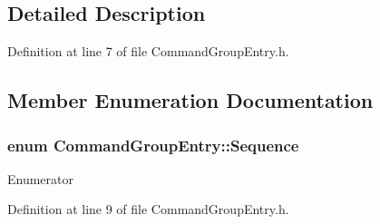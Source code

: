 \subsection{Detailed Description}


Definition at line 7 of file Command\-Group\-Entry.\-h.



\subsection{Member Enumeration Documentation}
\hypertarget{classCommandGroupEntry_a0c435eb6049bef341e92b3550e8f20b1}{
\subsubsection[{Sequence}]{\setlength{\rightskip}{0pt plus 5cm}enum {\bf Command\-Group\-Entry\-::\-Sequence}}}\label{classCommandGroupEntry_a0c435eb6049bef341e92b3550e8f20b1}
\begin{Desc}
\item[Enumerator]\par
\begin{description}
\item[{\em 
\hypertarget{classCommandGroupEntry_a0c435eb6049bef341e92b3550e8f20b1a88aa8647af6ba782f9faf0eb8986a730}{k\-Sequence\-\_\-\-In\-Sequence}\label{classCommandGroupEntry_a0c435eb6049bef341e92b3550e8f20b1a88aa8647af6ba782f9faf0eb8986a730}
}]\item[{\em 
\hypertarget{classCommandGroupEntry_a0c435eb6049bef341e92b3550e8f20b1a1576e3e1f5d8e12f32ebacb248fee63e}{k\-Sequence\-\_\-\-In\-Parallel}\label{classCommandGroupEntry_a0c435eb6049bef341e92b3550e8f20b1a1576e3e1f5d8e12f32ebacb248fee63e}
}]\end{description}
\end{Desc}


Definition at line 9 of file Command\-Group\-Entry.\-h.



